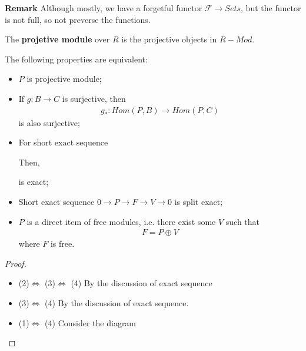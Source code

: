 \documentclass[Total.tex]{subfiles}
\begin{document}
			\textbf{Remark} Although mostly, we have a forgetful functor $\mathcal{F}\rightarrow Sets$, but the functor is not full, so not preverse the functions. 
			\begin{Def}
				The \textbf{projetive module} over $R$ is the projective objects in $R-Mod$.
			\end{Def}
			\begin{proposition}
				\label{Homological-Algebra-Projective-Injective-Modules-Equivalent-Definition-of-Projective-Modules}
				The following properties are equivalent:
				
				\begin{itemize}
					\item $P$ is projective module;
					\item If $g:B\rightarrow C$ is surjective, then
					\begin{gather*}
						g_*:Hom(P,B)\rightarrow Hom(P,C) 
					\end{gather*}
					is also surjective;
					\item For short exact sequence 
					Then, 
					\begin{center}
					\end{center}
					is exact;
					\item Short exact sequence $0\rightarrow P\rightarrow F\rightarrow V\rightarrow 0$ is split exact;
					\item $P$ is a direct item of free modules, i.e. there exist some $V$ such that
					\begin{gather*}
						F=P\oplus V
					\end{gather*}
					where $F$ is free.
				\end{itemize}
			\end{proposition}
			\begin{proof}
				\begin{itemize}
					\item (2)$\Leftrightarrow$ (3)$\Leftrightarrow$ (4) By the discussion of exact sequence
					\item (3)$\Leftrightarrow$ (4) By the discussion of exact sequence.
					\item (1)$\Leftrightarrow$ (4) Consider the diagram
					\begin{center}
					\end{center}
				\end{itemize}
			\end{proof}
			
\end{document}
